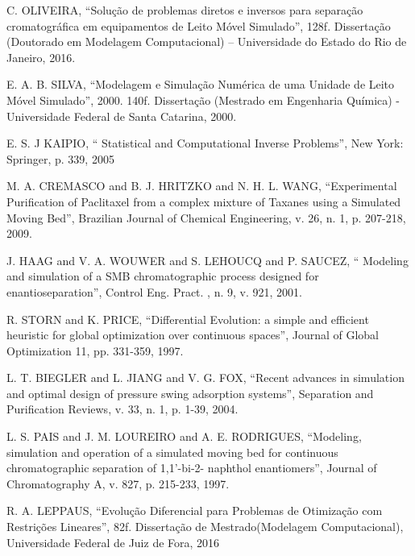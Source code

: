 \documentclass[por]{Template_SBEF}
\begin{document}
\noindent[3] C. OLIVEIRA, “Solução de problemas diretos e inversos para separação cromatográfica
em equipamentos de Leito Móvel Simulado”, 128f. Dissertação (Doutorado em Modelagem Computacional) – Universidade do Estado do Rio de Janeiro, 2016.
\vspace{10pt}


\noindent[4] E. A. B. SILVA, “Modelagem e Simulação Numérica de uma Unidade de Leito Móvel
Simulado”, 2000. 140f. Dissertação (Mestrado em Engenharia Química) - Universidade
Federal de Santa Catarina, 2000.
\vspace{10pt}


\noindent[5] E. S. J KAIPIO, “ Statistical and Computational Inverse Problems”, New York: Springer, p. 339,
2005
\vspace{10pt}


\noindent[6] M. A. CREMASCO and B. J. HRITZKO and N. H. L. WANG, “Experimental Purification
of Paclitaxel from a complex mixture of Taxanes using a Simulated Moving Bed”,
Brazilian Journal of Chemical Engineering, v. 26, n. 1, p. 207-218, 2009.
\vspace{10pt}


\noindent[7] J. HAAG and V. A. WOUWER and S. LEHOUCQ and P. SAUCEZ, “ Modeling and
simulation of a SMB chromatographic process designed for enantioseparation”, Control
Eng. Pract. , n. 9, v. 921, 2001.
\vspace{10pt}


\noindent[8] R. STORN and K. PRICE, “Differential Evolution:
a simple and efficient heuristic for global
optimization over continuous spaces”, Journal of
Global Optimization 11, pp. 331-359, 1997.
\vspace{10pt}


\noindent[9] L. T. BIEGLER and L. JIANG and V. G. FOX, “Recent advances in simulation and optimal
design of pressure swing adsorption systems”, Separation and Purification Reviews, v. 33,
n. 1, p. 1-39, 2004.
\vspace{10pt}

\noindent[10] L. S. PAIS and J. M. LOUREIRO and A. E. RODRIGUES, “Modeling, simulation and operation
of a simulated moving bed for continuous chromatographic separation of 1,1’-bi-2-
naphthol enantiomers”, Journal of Chromatography A, v. 827, p. 215-233, 1997.
\vspace{10pt}

\noindent[11] R. A. LEPPAUS, “Evolução Diferencial para Problemas de Otimização com Restrições Lineares”, 82f. Dissertação de Mestrado(Modelagem Computacional), Universidade Federal de Juiz de Fora, 2016
\vspace{10pt}

%



\end{document}
